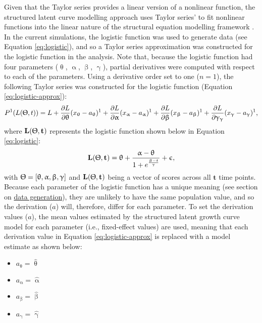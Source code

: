 \documentclass[
12pt, %
twoside,
english]{guelphthesis}
\begin{document}
Given that the Taylor series provides a linear version of a nonlinear function, the structured latent curve modelling approach uses Taylor series' to fit nonlinear functions into the linear nature of the structural equation modelling framework \autocite{browne1991,browne1993}. In the current simulations, the logistic function was used to generate data (see Equation \ref{eq:logistic}), and so a Taylor series approximation was constructed for the logistic function in the analysis. Note that, because the logistic function had four parameters (\(\uptheta\), \(\upalpha\), \(\upbeta\), \(\upgamma\)), partial derivatives were computed with respect to each of the parameters. Using a derivative order set to one
(\(n = 1\)), the following Taylor series was constructed for the logistic
function (Equation \ref{eq:logistic-approx}):
\begin{align}
 P^1(L(\Uptheta, t)) = L + \frac{\partial L}{\partial \uptheta}(x_{\uptheta}-a_{\uptheta})^1 + \frac{\partial L}{\partial \upalpha}(x_{\upalpha}-a_{\upalpha})^1 + \frac{\partial L}{\partial \upbeta}(x_{\upbeta}-a_{\upbeta})^1 + \frac{\partial L}{\partial \upgamma_{\upgamma}}(x_{\upgamma}-a_{\upgamma})^1, 
\label{eq:logistic-approx}
\end{align}
\noindent where \(\mathbf{L(\Uptheta, t)}\) represents the logistic function shown below in
Equation \ref{eq:logistic}:
\begin{align}
  \mathbf{L(\Uptheta, t)} = \uptheta + \frac{\upalpha - \uptheta}{{1 + e^\frac{\upbeta - t}{\upgamma}}} + \upepsilon, 
\label{eq:logistic}
\end{align}
\noindent with \(\mathbf{\Uptheta} = [\uptheta, \upalpha, \upbeta, \upgamma]\) and \(\mathbf{L(\Uptheta, t)}\) being a vector of scores across all \(\mathbf{t}\) time points. Because each parameter of the logistic function has a unique meaning (see section on \protect\hyperlink{data-generation}{data generation}), they are unlikely to have the same population value, and so the derivation (\(a\)) will, therefore, differ for each parameter. To set the derivation values (\(a\)), the mean values estimated by the structured latent growth curve model for each parameter (i.e., fixed-effect values) are used, meaning that each derivation value in Equation \ref{eq:logistic-approx} is replaced with a model estimate as shown below:
\begin{itemize}
\tightlist
\item
  \(a_{\uptheta} = \hat{\uptheta}\)
\item
  \(a_{\upalpha} = \hat{\upalpha}\)
\item
  \(a_{\upbeta} = \hat{\upbeta}\)
\item
  \(a_{\upgamma} = \hat{\upgamma}\)
\end{itemize}
\end{document}
